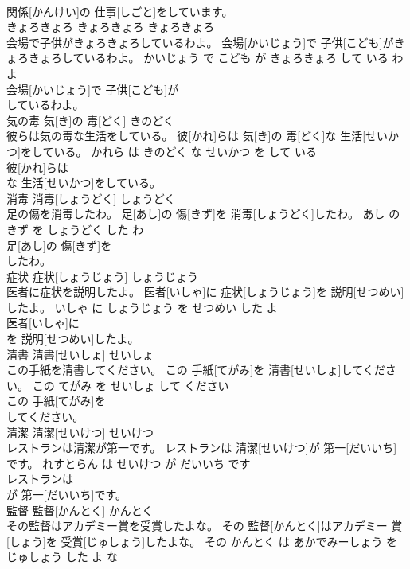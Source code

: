 \documentclass[8pt]{extreport}
\begin{document}
\begin{CJK}{UTF8}{min}
\\	関係[かんけい]の 仕事[しごと]をしています。			
\\	きょろきょろ	きょろきょろ	きょろきょろ	
\\	会場で子供がきょろきょろしているわよ。	会場[かいじょう]で 子供[こども]がきょろきょろしているわよ。	かいじょう で こども が きょろきょろ して いる わ よ	
\\	会場[かいじょう]で 子供[こども]が
\\	しているわよ。			
\\	気の毒	気[き]の 毒[どく]	きのどく	
\\	彼らは気の毒な生活をしている。	彼[かれ]らは 気[き]の 毒[どく]な 生活[せいかつ]をしている。	かれら は きのどく な せいかつ を して いる	
\\	彼[かれ]らは
\\	な 生活[せいかつ]をしている。			
\\	消毒	消毒[しょうどく]	しょうどく	
\\	足の傷を消毒したわ。	足[あし]の 傷[きず]を 消毒[しょうどく]したわ。	あし の きず を しょうどく した わ	
\\	足[あし]の 傷[きず]を
\\	したわ。			
\\	症状	症状[しょうじょう]	しょうじょう	
\\	医者に症状を説明したよ。	医者[いしゃ]に 症状[しょうじょう]を 説明[せつめい]したよ。	いしゃ に しょうじょう を せつめい した よ	
\\	医者[いしゃ]に
\\	を 説明[せつめい]したよ。			
\\	清書	清書[せいしょ]	せいしょ	
\\	この手紙を清書してください。	この 手紙[てがみ]を 清書[せいしょ]してください。	この てがみ を せいしょ して ください	
\\	この 手紙[てがみ]を
\\	してください。			
\\	清潔	清潔[せいけつ]	せいけつ	
\\	レストランは清潔が第一です。	レストランは 清潔[せいけつ]が 第一[だいいち]です。	れすとらん は せいけつ が だいいち です	
\\	レストランは
\\	が 第一[だいいち]です。			
\\	監督	監督[かんとく]	かんとく	
\\	その監督はアカデミー賞を受賞したよな。	その 監督[かんとく]はアカデミー 賞[しょう]を 受賞[じゅしょう]したよな。	その かんとく は あかでみーしょう を じゅしょう した よ な	

\end{CJK}
\end{document}
